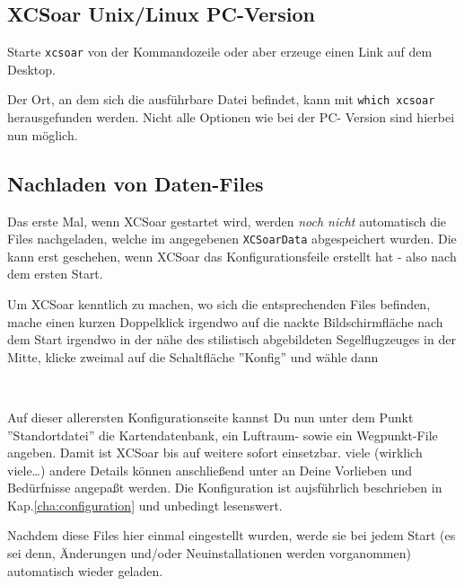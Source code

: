 \subsection*{{\textsf  XCSoar} Unix/Linux PC-Version}
Starte \verb|xcsoar| von der Kommandozeile oder aber erzeuge einen Link auf dem Desktop. 

Der Ort, an dem sich die ausführbare Datei befindet,  kann mit \verb|which xcsoar| herausgefunden werden.
Nicht alle Optionen wie bei der PC- Version sind hierbei nun möglich.
 
\subsection*{Nachladen von Daten-Files}
Das erste Mal, wenn {\textsf  XCSoar} gestartet wird, werden {\sl noch nicht} automatisch die Files nachgeladen, welche im 
angegebenen \verb|XCSoarData| abgespeichert wurden. Die kann erst geschehen, wenn {\textsf  XCSoar} das Konfigurationsfeile erstellt hat - also nach dem ersten Start.


Um {\textsf  XCSoar} kenntlich zu machen, wo sich die entsprechenden Files befinden, mache einen kurzen Doppelklick irgendwo auf die nackte Bildschirmfläche 
 nach dem Start irgendwo in der nähe des stilistisch abgebildeten Segelflugzeuges in der Mitte, klicke zweimal auf die Schaltfläche ''Konfig'' 
und wähle dann 
\begin{center}
~\blink~~\blink~ 
\end{center}

Auf dieser allerersten Konfigurationseite kannst Du nun unter dem Punkt ''Standortdatei''  die Kartendatenbank, ein Luftraum- sowie ein Wegpunkt-File angeben.
Damit ist {\textsf  XCSoar} bis auf weitere sofort einsetzbar.
viele (wirklich viele\dots) andere Details können anschließend unter  an Deine Vorlieben und Bedürfnisse angepaßt werden. 
Die Konfiguration  ist aujsführlich beschrieben in Kap.\ref{cha:configuration} und unbedingt lesenswert. 

Nachdem diese Files hier einmal eingestellt wurden, werde sie bei jedem Start (es sei denn, Änderungen und/oder Neuinstallationen werden vorganommen)
automatisch wieder geladen.


